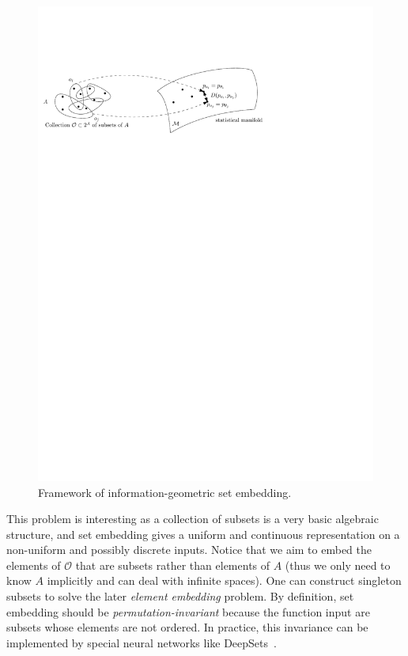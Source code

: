 \documentclass{article}
\begin{document}
\begin{figure}[!h]
\includegraphics[width=\textwidth]{setembedding}
\caption{Framework of information-geometric set embedding.}\label{fig:igse}
\end{figure}

This problem is interesting as a collection of subsets is a very basic algebraic structure,
and set embedding gives a uniform and continuous representation on a
non-uniform and possibly discrete inputs. Notice that we aim to embed the
elements of $\mathcal{O}$ that are subsets rather than elements of $A$ (thus we only need to know $A$ implicitly and can deal with infinite spaces).
One can construct singleton subsets to solve the later {\em element embedding} problem.
By definition, set embedding should be {\em permutation-invariant} because the function input
are subsets whose elements are not ordered.
In practice, this invariance can be implemented by special neural networks like DeepSets~\cite{deepsets}.
\end{document}
